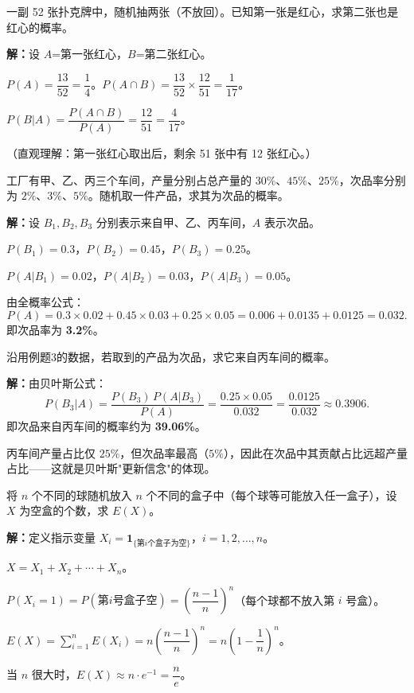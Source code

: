 \documentclass[12pt, a4paper]{ctexart}
\begin{document}
\begin{examplebox}[【例题2】条件概率计算]
一副 52 张扑克牌中，随机抽两张（不放回）。已知第一张是红心，求第二张也是红心的概率。
\end{examplebox}

\textbf{解：}\quad 设 $A$=第一张红心，$B$=第二张红心。\par
$P(A)=\dfrac{13}{52}=\dfrac{1}{4}$。$P(A\cap B)=\dfrac{13}{52}\times\dfrac{12}{51}=\dfrac{1}{17}$。\par
$P(B|A)=\dfrac{P(A\cap B)}{P(A)}=\dfrac{12}{51}=\dfrac{4}{17}$。\par
（直观理解：第一张红心取出后，剩余 51 张中有 12 张红心。）

\begin{examplebox}
工厂有甲、乙、丙三个车间，产量分别占总产量的 $30\%$、$45\%$、$25\%$，次品率分别为 $2\%$、$3\%$、$5\%$。随机取一件产品，求其为次品的概率。
\end{examplebox}

\textbf{解：}\quad 设 $B_1,B_2,B_3$ 分别表示来自甲、乙、丙车间，$A$ 表示次品。\par
$P(B_1)=0.3$，$P(B_2)=0.45$，$P(B_3)=0.25$。\par
$P(A|B_1)=0.02$，$P(A|B_2)=0.03$，$P(A|B_3)=0.05$。\par
由全概率公式：
\[
P(A)=0.3\times0.02+0.45\times0.03+0.25\times0.05=0.006+0.0135+0.0125=0.032.
\]
即次品率为 \textbf{3.2\%}。

\begin{examplebox}
沿用例题3的数据，若取到的产品为次品，求它来自丙车间的概率。
\end{examplebox}

\textbf{解：}\quad 由贝叶斯公式：
\[
P(B_3|A)=\frac{P(B_3)\,P(A|B_3)}{P(A)}=\frac{0.25\times0.05}{0.032}=\frac{0.0125}{0.032}\approx 0.3906.
\]
即次品来自丙车间的概率约为 \textbf{39.06\%}。\par
\begin{tipbox}[方法总结]
丙车间产量占比仅 $25\%$，但次品率最高（$5\%$），因此在次品中其贡献占比远超产量占比——这就是贝叶斯"更新信念"的体现。
\end{tipbox}

\begin{examplebox}
将 $n$ 个不同的球随机放入 $n$ 个不同的盒子中（每个球等可能放入任一盒子），设 $X$ 为空盒的个数，求 $E(X)$。
\end{examplebox}

\textbf{解：}\quad 定义指示变量 $X_i=\mathbf{1}_{\{\text{第}i\text{个盒子为空}\}}$，$i=1,2,\dots,n$。\par
$X=X_1+X_2+\cdots+X_n$。\par
$P(X_i=1)=P(\text{第}i\text{号盒子空})=\left(\dfrac{n-1}{n}\right)^n$（每个球都不放入第 $i$ 号盒）。\par
$E(X)=\sum_{i=1}^{n}E(X_i)=n\left(\dfrac{n-1}{n}\right)^n=n\left(1-\dfrac{1}{n}\right)^n$。\par
当 $n$ 很大时，$E(X)\approx n\cdot e^{-1}=\dfrac{n}{e}$。
\end{document}

